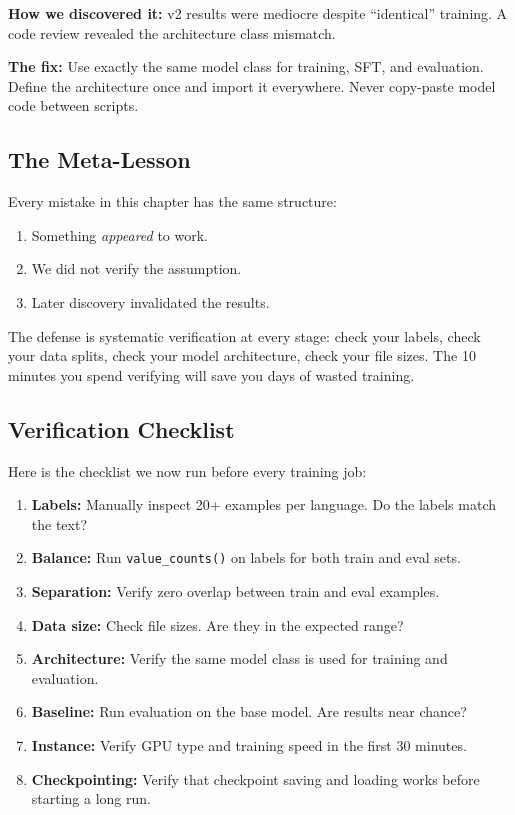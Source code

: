\documentclass[11pt,a4paper]{article}
\begin{document}
\textbf{How we discovered it:} v2 results were mediocre despite ``identical'' training. A code review revealed the architecture class mismatch.

\textbf{The fix:} Use exactly the same model class for training, SFT, and evaluation. Define the architecture once and import it everywhere. Never copy-paste model code between scripts.

\subsection{The Meta-Lesson}

\begin{keyidea}
Every mistake in this chapter has the same structure:
\begin{enumerate}
    \item Something \emph{appeared} to work.
    \item We did not verify the assumption.
    \item Later discovery invalidated the results.
\end{enumerate}

The defense is systematic verification at every stage: check your labels, check your data splits, check your model architecture, check your file sizes. The 10 minutes you spend verifying will save you days of wasted training.
\end{keyidea}

\subsection{Verification Checklist}

Here is the checklist we now run before every training job:

\begin{enumerate}
    \item[$\square$] \textbf{Labels:} Manually inspect 20+ examples per language. Do the labels match the text?
    \item[$\square$] \textbf{Balance:} Run \texttt{value\_counts()} on labels for both train and eval sets.
    \item[$\square$] \textbf{Separation:} Verify zero overlap between train and eval examples.
    \item[$\square$] \textbf{Data size:} Check file sizes. Are they in the expected range?
    \item[$\square$] \textbf{Architecture:} Verify the same model class is used for training and evaluation.
    \item[$\square$] \textbf{Baseline:} Run evaluation on the base model. Are results near chance?
    \item[$\square$] \textbf{Instance:} Verify GPU type and training speed in the first 30 minutes.
    \item[$\square$] \textbf{Checkpointing:} Verify that checkpoint saving and loading works before starting a long run.
\end{enumerate}
\end{document}
